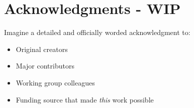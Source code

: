 \chapter*{Acknowledgments - WIP}

Imagine a detailed and officially worded acknowledgment to:
\begin{itemize}
 em
\item Original creators
\item Major contributors
\item Working group colleagues
\item Funding source that made \emph{this} work possible
\end{itemize}
